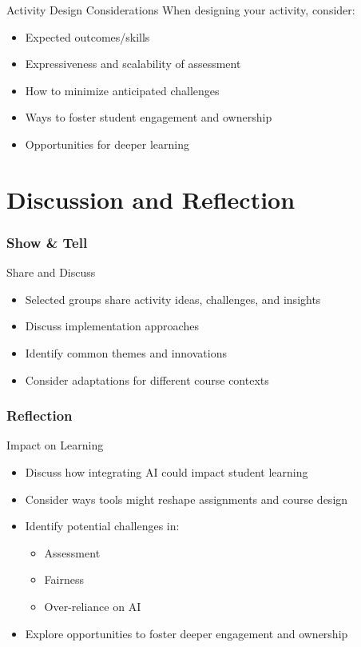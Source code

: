 \documentclass[xcolor=dvipsnames, aspectratio=169]{beamer}
\begin{document}
\begin{frame}{Activity Design Considerations}
  When designing your activity, consider:
  \begin{itemize}
    \item Expected outcomes/skills
    \item Expressiveness and scalability of assessment
    \item How to minimize anticipated challenges
    \item Ways to foster student engagement and ownership
    \item Opportunities for deeper learning
  \end{itemize}
\end{frame}

\part[Discussion and Reflection]{Discussion and Reflection}
\section{Show \& Tell}

\begin{frame}{Share and Discuss}
  \begin{itemize}
    \item Selected groups share activity ideas, challenges, and insights
    \item Discuss implementation approaches
    \item Identify common themes and innovations
    \item Consider adaptations for different course contexts
  \end{itemize}
\end{frame}

\section{Reflection}

\begin{frame}{Impact on Learning}
  \begin{itemize}
    \item Discuss how integrating AI could impact student learning
    \item Consider ways tools might reshape assignments and course design
    \item Identify potential challenges in:
      \begin{itemize}
        \item Assessment
        \item Fairness
        \item Over-reliance on AI
      \end{itemize}
    \item Explore opportunities to foster deeper engagement and ownership
  \end{itemize}
\end{frame}
\end{document}

